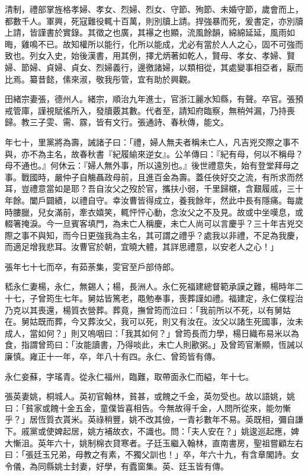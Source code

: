 \begin{pinyinscope}
清制，禮部掌旌格孝婦、孝女、烈婦、烈女、守節、殉節、未婚守節，歲會而上，都數千人。軍興，死寇難役輒十百萬，則別牘上請。捍強暴而死，爰書定，亦別牘上請，皆謹書於實錄。其徵之也廣，其襮之也顯，流風餘韻，綿綿延延，風雨如晦，雞鳴不已。故知權所以能行，化所以能成，尤必有當於人人之心，固不可強而致也。列女入史，始後漢書，用其例，擇尤炳著如乾人，賢母、孝女、孝婦、賢婦、節婦、貞婦、貞女、烈婦義行，邊徼諸婦，以類相從，其處變事相亞者，厭而比焉。纂昔懿，傃來淑，敬我彤管，宜有助於興觀。

田緒宗妻張，德州人。緒宗，順治九年進士，官浙江麗水知縣，有聲。卒官。張預戒管庫，謹視賦徭所入，發牘覈其數。代者至，請知府臨察，無稍舛漏，乃持喪歸。教三子雯、需、霡，皆有文行。張通詩、春秋傳，能文。

年七十，里黨將為壽，誡諸子曰：「禮，婦人無夫者稱未亡人，凡吉兇交際之事不與，亦不為主名，故春秋書『紀履緰來逆女』。公羊傳曰：『紀有母，何以不稱母？母不通也。』何休云：『婦人無外事，所以遠別也。』後世禮意失，始有登堂拜母之事。戰國時，嚴仲子自觴聶政母前，且進百金為壽。蓋任俠好交之流，有所求而然耳，豈禮意當如是耶？吾自汝父之歿於官，攜扶小弱，千里歸櫬，含艱履戚，三十年餘。闔戶闢績，以禮自守。幸汝曹皆得成立，養我餘年，然此中長有隱痛。每歲時膢臘，兒女滿前，牽衣嬉笑，輒怦怦心動，念汝父之不及見。故或中坐嘆息，或輟箸掩淚。今一旦賓客填門，為未亡人稱慶，未亡人尚可以言慶乎？三十年吉兇交際之事不與知，而今日更強我為主名，其可謂之禮乎？處我以非禮，不足為我慶，而適足增我悲耳。汝曹官於朝，宜曉大體，其詳思禮意，以安老人之心！」

張年七十七而卒，有茹荼集，雯官至戶部侍郎。

嵇永仁妻楊，永仁，無錫人；楊，長洲人。永仁死福建總督範承謨之難，楊時年二十七，子曾筠生七年。舅姑皆篤老，黽勉奉事，喪葬謹如禮。福建定，永仁僕程治乃克以其喪還，楊質衣營葬。葬竟，撫曾筠而泣曰：「我前所以不死，以有舅姑在。舅姑既而葬，今又葬汝父，我可以死，則又有汝在。汝父以諸生死國事，汝未成人，當如何？」則又嗚咽曰：「我其如何？」曾筠長而力學，楊日織布易米以為食，指謂曾筠曰：「汝能讀書，乃得啖此，未亡人則歠粥。」及曾筠官漸顯，恆誡以廉慎。雍正十一年，卒，年八十有四。永仁、曾筠皆有傳。

永仁妾蘇，字瑤青。從永仁福州，臨難，取帶面永仁而縊，年十七。

張英妻姚，桐城人。英初官翰林，貧甚，或餽之千金，英勿受也。故以語姚，姚曰：「貧家或餽十金五金，童僕皆喜相告。今無故得千金，人問所從來，能勿慚乎？」居恆質衣貰米。英祿稍豐，姚不改其儉，一青衫數年不易。英既相，彌自謙下。戚黨或使婢起居，姚方補故衣，不識也。問：「夫人安在？」姚逡巡起應，婢大慚沮。英年六十，姚制棉衣貸寒者。子廷玉繼入翰林，直南書房，聖祖嘗顧左右曰：「張廷玉兄弟，母教之有素，不獨父訓也！」卒，年六十九，有含章閣詩。女令儀，為同縣姚士封妻，好學，有蠹窗集。英、廷玉皆有傳。


\end{pinyinscope}
